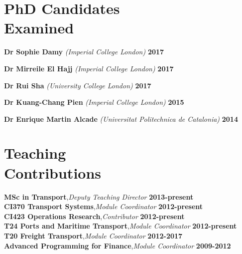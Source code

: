 \documentclass[margin]{res}
\begin{document}
\begin{resume}
\section{\sc PhD Candidates\\ Examined}
	\begin{minipage}{\textwidth}
	{\bf Dr Sophie Damy} \textit{(Imperial College London)} \hfill {\bf 2017}
	\vspace{0.03in}
	\end{minipage}
	\begin{minipage}{\textwidth}
	{\bf Dr Mirreile El Hajj} \textit{(Imperial College London)} \hfill {\bf 2017}
	\vspace{0.03in}
	\end{minipage}
	\begin{minipage}{\textwidth}
	{\bf Dr Rui Sha} \textit{(University College London)} \hfill {\bf 2017}
	\vspace{0.03in}
	\end{minipage}
	\begin{minipage}{\textwidth}
	{\bf Dr Kuang-Chang Pien} \textit{(Imperial College London)} \hfill {\bf 2015}
	\vspace{0.03in}
	\end{minipage}
	\begin{minipage}{\textwidth}
	{\bf Dr Enrique Martin Alcade} \textit{(Universitat Politechnica de Catalonia)} \hfill {\bf 2014}
	\vspace{0.03in}
	\end{minipage}

\section{\sc Teaching\\ Contributions}
	{\bf MSc in Transport},\textit{Deputy Teaching Director} \hfill {\bf 2013-present}\\
	{\bf CI370 Transport Systems},\textit{Module Coordinator} \hfill {\bf 2012-present}\\
	{\bf CI423 Operations Research},\textit{Contributor} \hfill {\bf 2012-present}\\
	{\bf T24 Ports and Maritime Transport},\textit{Module Coordinator} \hfill {\bf 2012-present}\\
	{\bf T20 Freight Transport},\textit{Module Coordinator} \hfill {\bf 2012-2017}\\
	{\bf Advanced Programming for Finance},\textit{Module Coordinator} \hfill {\bf 2009-2012}\\


\end{resume}
\end{document}
